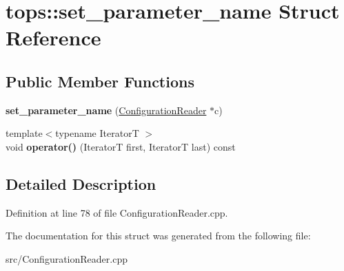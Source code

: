 \hypertarget{structtops_1_1set__parameter__name}{}\section{tops\+:\+:set\+\_\+parameter\+\_\+name Struct Reference}
\label{structtops_1_1set__parameter__name}
\subsection*{Public Member Functions}
\begin{DoxyCompactItemize}
\item 
\mbox{\label{structtops_1_1set__parameter__name_a79ca039e98a03b4d851720202087b313}} 
{\bfseries set\+\_\+parameter\+\_\+name} (\hyperlink{classtops_1_1ConfigurationReader}{Configuration\+Reader} $\ast$c)
\item 
\mbox{\label{structtops_1_1set__parameter__name_af58e78139997f3e37b1765706cb71a5b}} 
{\footnotesize template$<$typename IteratorT $>$ }\\void {\bfseries operator()} (IteratorT first, IteratorT last) const
\end{DoxyCompactItemize}


\subsection{Detailed Description}


Definition at line 78 of file Configuration\+Reader.\+cpp.



The documentation for this struct was generated from the following file\+:\begin{DoxyCompactItemize}
\item 
src/Configuration\+Reader.\+cpp\end{DoxyCompactItemize}

